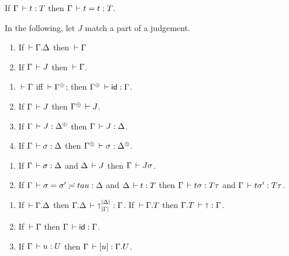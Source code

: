 \documentclass[acmlarge,review,anonymous]{acmart}\settopmatter{printfolios=true}
\begin{document}
\begin{lemma}[Reflexivity]
  If\/ $\Gamma \,\vdash t : T$ then $\Gamma \,\vdash t = t : T$.
\end{lemma}

In the following, let $J$ %
match a part of a judgement.

\begin{lemma}
\label{lem:cxtwf}\bla
  \begin{enumerate}
  \item If $\,\vdash \Gamma. \Delta$ then $\,\vdash \Gamma$
  \item If\/ $\Gamma \,\vdash J$ then $\,\vdash \Gamma$.
  \end{enumerate}
\end{lemma}

\begin{lemma}[Resurrection]
\label{lem:res} \bla
\begin{enumerate}
\item $\,\vdash \Gamma$ iff $\der \resurrect\Gamma$;  then $\resurrect \Gamma \der \sid : \Gamma$.
\item If\/ $\Gamma \,\vdash J$ then $\resurrect \Gamma \der J$.
\item If\/ $\Gamma \der J : \resurrect \Delta$ %
  then $\Gamma \,\vdash J : \Delta$.
\item If\/ $\Gamma \,\vdash \sigma : \Delta$ %
  then $\resurrect\Gamma \der \sigma : \resurrect\Delta$.
\end{enumerate}
\end{lemma}

\begin{lemma}[Substitution]
\label{lem:sub}\bla
\begin{enumerate}
\item
  If\/ $\Gamma \,\vdash \sigma : \Delta$ and $\Delta \,\vdash J$ then $\Gamma \,\vdash J\sigma$.
\item
  If\/ $\Gamma \,\vdash \sigma = \sigma' \risingdotseq tau : \Delta$ and $\Delta \,\vdash t : T$ then
  $\Gamma \,\vdash t\sigma : T\tau$ and $\Gamma \,\vdash t\sigma' : T\tau$.
\end{enumerate}
\end{lemma}

\begin{lemma}
\label{lem:specsub}\bla
\begin{enumerate}
\item If $\,\vdash \Gamma. \Delta$ then $\Gamma. \Delta \,\vdash \mathord{\shortuparrow}_{|\Gamma|}^{|\Delta|} : \Gamma$.
      If $\,\vdash \Gamma. T$ then $\Gamma. T \,\vdash \mathord{\shortuparrow} : \Gamma$.
\item If $\,\vdash \Gamma$ then $\Gamma \,\vdash \mathsf{id} : \Gamma$.
\item If $\Gamma \,\vdash u : U$ then $\Gamma \,\vdash [u] : \Gamma. U$.
\end{enumerate}
\end{lemma}
\end{document}
